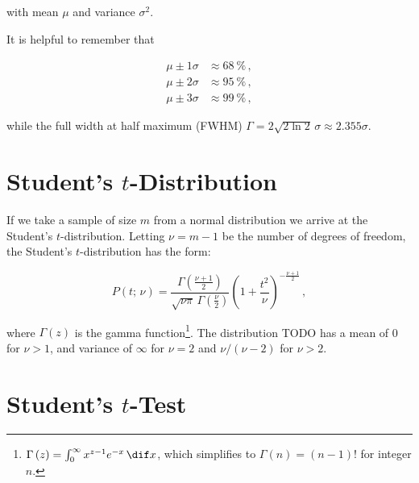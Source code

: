 \noindent with mean $\mu$ and variance $\sigma^{2}$.

It is helpful to remember that

\begin{equation}\label{eq:stats:gauss:sigmas}
\begin{split}
\mu \pm 1\sigma &\approx \SI{68}{\percent}\,, \\
\mu \pm 2\sigma &\approx \SI{95}{\percent}\,, \\
\mu \pm 3\sigma &\approx \SI{99}{\percent}\,,
\end{split}
\end{equation}

\noindent while the full width at half maximum (FWHM) $\Gamma = 2\sqrt{2 \ln{2}}\,\sigma \approx \num{2.355} \sigma$.

\section{Student's \texorpdfstring{$t$}{t}-Distribution}
\label{stats:t_dist}

If we take a sample of size $m$ from a normal distribution
we arrive at the Student's $t$-distribution.
Letting $\nu = m-1$ be the number of degrees of freedom,
the Student's $t$-distribution has the form:

\begin{equation}\label{eq:stats:t_dist:P}
P\left(t;\,\nu\right) = \frac{
\Gamma\left(\frac{\nu+1}{2}\right)
}{
\sqrt{\nu \pi}\,\Gamma\left(\frac{\nu}{2}\right)
} \left(1+\frac{t^{2}}{\nu}\right)^{-\frac{\nu+1}{2}}\,,
\end{equation}

\noindent where $\Gamma\left(z\right)$ is the gamma function\footnote{$\Gamma\left(z\right) = \int_{0}^{\infty} x^{z-1} e^{-x} \, \dif x$,
which simplifies to $\Gamma\left(n\right)=\left(n-1\right)!$ for integer $n$.}.
The distribution TODO has a mean of \num{0} for $\nu > 1$,
and variance of $\infty$ for $\nu =2$ and $\nu / \left(\nu-2\right)$ for $\nu > 2$.

\section{Student's \texorpdfstring{$t$}{t}-Test}
\label{stats:t_test}

